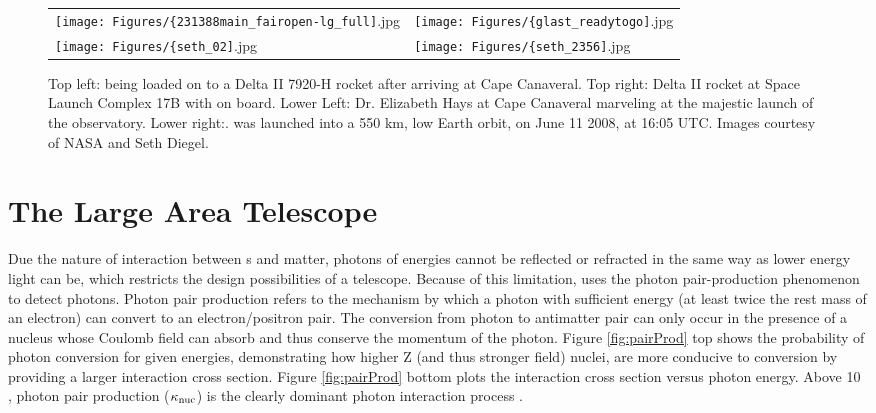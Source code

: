 \begin{figure}[!]
	\begin{center}
		\hspace*{-1.5cm} \begin{tabular}{ll}
			\texttt{[image: Figures/\{231388main\_fairopen-lg\_full]}.jpg} &
			\texttt{[image: Figures/\{glast\_readytogo]}.jpg} \\
			
			\texttt{[image: Figures/\{seth\_02]}.jpg} &
			\texttt{[image: Figures/\{seth\_2356]}.jpg} \\

		\end{tabular}
	\end{center}
	\caption[\Fermi{} launch images.]{
		\label{fig:Launch}{Top left: \Fermi{} being loaded on to a Delta II 7920-H rocket after arriving at Cape Canaveral. Top right: Delta II rocket  at Space Launch Complex 17B with \Fermi{} on board. Lower Left: Dr. Elizabeth Hays at Cape Canaveral marveling at the majestic launch of the \Fermi{} observatory. Lower right:.\Fermi{} was launched into a 550 km, low Earth orbit, on June 11 2008, at 16:05 UTC. Images courtesy of NASA and Seth Diegel.}
	}
\end{figure}

\section{\label{FGST:LAT}The Large Area Telescope}
Due the nature of interaction between \gam{}s and matter, photons of \gam{} energies cannot be reflected or refracted in the same way as lower energy light can be, which restricts the design possibilities of a \gam{} telescope. Because of this limitation, \Fermi{} uses the photon pair-production phenomenon to detect \gam{} photons. Photon pair production refers to the mechanism by which a
photon with sufficient energy (at least twice the rest mass of an electron) can convert to an electron/positron pair. The conversion from photon to antimatter pair can only occur in the presence of a nucleus whose Coulomb field can absorb and thus conserve the momentum of the photon. Figure \ref{fig:pairProd} top shows the probability of photon conversion for given energies, demonstrating how higher Z (and thus stronger field) nuclei, are more conducive to conversion by providing a larger interaction cross section. Figure \ref{fig:pairProd} bottom plots the interaction cross section versus photon energy. Above 10 \mev{}, photon pair production (${\rm \kappa_{nuc}}$) is the clearly dominant photon interaction process \cite{Beringer12}.

